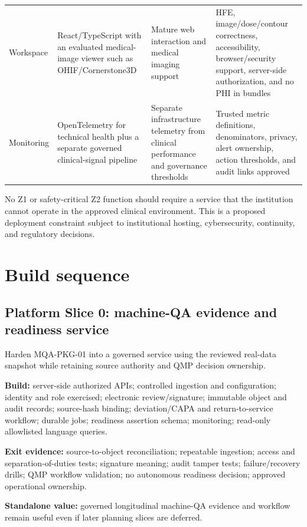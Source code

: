 \documentclass[11pt,letterpaper]{article}
\begin{document}
\begin{small}
\begin{longtable}{@{}L{0.15\textwidth}L{0.22\textwidth}L{0.31\textwidth}L{0.22\textwidth}@{}}
\addlinespace[2pt]
Workspace & React/TypeScript with an evaluated medical-image viewer such as OHIF/Cornerstone3D & Mature web interaction and medical imaging support & HFE, image/dose/contour correctness, accessibility, browser/security support, server-side authorization, and no PHI in bundles \\
\addlinespace[2pt]
Monitoring & OpenTelemetry for technical health plus a separate governed clinical-signal pipeline & Separate infrastructure telemetry from clinical performance and governance thresholds & Trusted metric definitions, denominators, privacy, alert ownership, action thresholds, and audit links approved \\
\end{longtable}
\end{small}

No Z1 or safety-critical Z2 function should require a service that the institution cannot operate in the approved clinical environment. This is a proposed deployment constraint subject to institutional hosting, cybersecurity, continuity, and regulatory decisions.

\section{Build sequence}

\subsection{Platform Slice 0: machine-QA evidence and readiness service}

Harden MQA-PKG-01 into a governed service using the reviewed real-data snapshot while retaining source authority and QMP decision ownership.

\textbf{Build:} server-side authorized APIs; controlled ingestion and configuration; identity and role exercised; electronic review/signature; immutable object and audit records; source-hash binding; deviation/CAPA and return-to-service workflow; durable jobs; readiness assertion schema; monitoring; read-only allowlisted language queries.

\textbf{Exit evidence:} source-to-object reconciliation; repeatable ingestion; access and separation-of-duties tests; signature meaning; audit tamper tests; failure/recovery drills; QMP workflow validation; no autonomous readiness decision; approved operational ownership.

\textbf{Standalone value:} governed longitudinal machine-QA evidence and workflow remain useful even if later planning slices are deferred.
\end{document}
